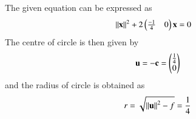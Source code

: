The given equation can be expressed as 
\begin{align}
\left\lVert\mathbf{x}\right\rVert^2+2\begin{pmatrix}\frac{-1}{4} & 0\end{pmatrix}\mathbf{x}&=0
\end{align}	
The centre of circle is then given by 
\begin{align}
	\mathbf{u} = -\mathbf{c} 
=\begin{pmatrix}\frac{1}{4}\\0\end{pmatrix}
\end{align}
and the radius of circle is obtained as
\begin{align}
	r=\sqrt{\left\lVert\mathbf{u}\right\rVert^2 -f}
=\frac{1}{4}
\end{align}

